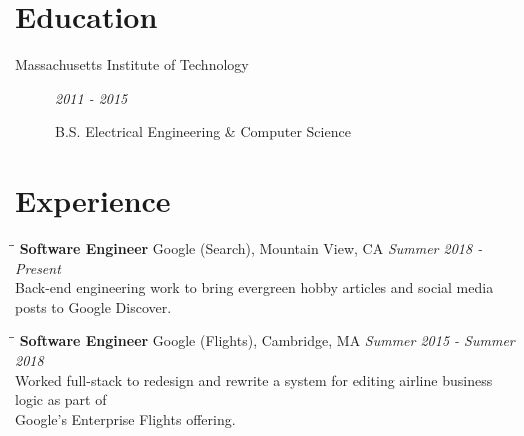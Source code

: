 \documentclass{res}
\begin{document}

	\address{
		2850 Middlefield Rd \\
		Apartment A306 \\
		Palo Alto, CA 94306
	}

	\address{
		woursler@gmail.com \\
		(541)-601-8295
	}

	\begin{resume}

		\vspace{-10pt}
		\section{Education}
			\begin{description}

				\item[Massachusetts Institute of Technology] \textit{2011 - 2015}

				B.S. Electrical Engineering \& Computer Science
			\end{description}

		\vspace{-20pt}
		\section{Experience}
			\vspace{-0.1in}

			\begin{tabbing}
				\hspace{2.3in}\= \hspace{2.6in}\= \kill %
				{\bf Software Engineer}	\>Google (Search), Mountain View, CA	\> \textit{Summer 2018 - Present}
				\\ Back-end engineering work to bring evergreen hobby articles and social media posts to Google Discover.
			\end{tabbing}\vspace{-20pt}

			\begin{tabbing}
				\hspace{2.3in}\= \hspace{2.6in}\= \kill %
				{\bf Software Engineer}	\>Google (Flights), Cambridge, MA	\> \textit{Summer 2015 - Summer 2018}
				\\ Worked full-stack to redesign and rewrite a system for editing airline business logic as part of
				\\ Google's Enterprise Flights offering.
			\end{tabbing}\vspace{-20pt}


\end{resume}
\end{document}
